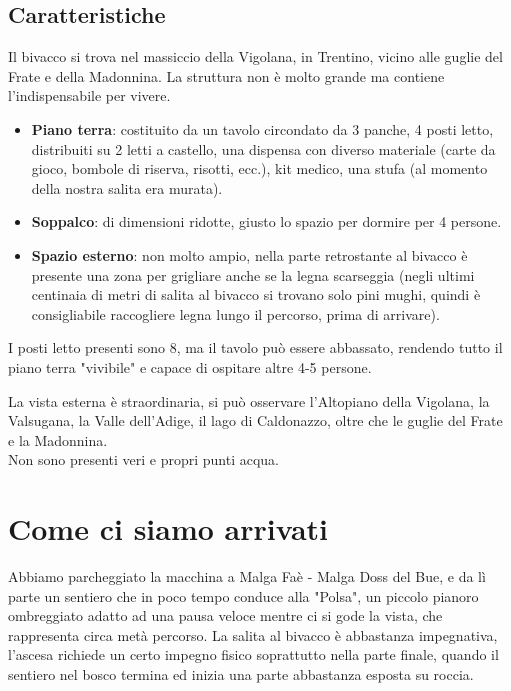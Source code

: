 \documentclass{article}
\begin{document}
\subsection{Caratteristiche}
Il bivacco si trova nel massiccio della Vigolana, in Trentino, vicino alle guglie del Frate e della Madonnina.
La struttura non è molto grande ma contiene l'indispensabile per vivere.
\begin{itemize}
    \item \textbf{Piano terra}: costituito da un tavolo circondato da 3 panche, 4 posti letto, distribuiti su 2 letti a castello, una dispensa con diverso materiale (carte da gioco, bombole di riserva, risotti, ecc.), kit medico, una stufa (al momento della nostra salita era murata).
    \item \textbf{Soppalco}: di dimensioni ridotte, giusto lo spazio per dormire per 4 persone.
    \item \textbf{Spazio esterno}: non molto ampio, nella parte retrostante al bivacco è presente una zona per grigliare anche se la legna scarseggia (negli ultimi centinaia di metri di salita al bivacco si trovano solo pini mughi, quindi è consigliabile raccogliere legna lungo il percorso, prima di arrivare).
\end{itemize}

I posti letto presenti sono 8, ma il tavolo può essere abbassato, rendendo tutto il piano terra "vivibile" e capace di ospitare altre 4-5 persone.

La vista esterna è straordinaria, si può osservare l'Altopiano della Vigolana, la Valsugana, la Valle dell'Adige, il lago di Caldonazzo, oltre che le guglie del Frate e la Madonnina.\\

Non sono presenti veri e propri punti acqua.

\section{Come ci siamo arrivati}
Abbiamo parcheggiato la macchina a Malga Faè - Malga Doss del Bue, e da lì parte un sentiero che in poco tempo conduce alla "Polsa", un piccolo pianoro ombreggiato adatto ad una pausa veloce mentre ci si gode la vista, che rappresenta circa metà percorso. La salita al bivacco è abbastanza impegnativa, l'ascesa richiede un certo impegno fisico soprattutto nella parte finale, quando il sentiero nel bosco termina ed inizia una parte abbastanza esposta su roccia.
\end{document}
